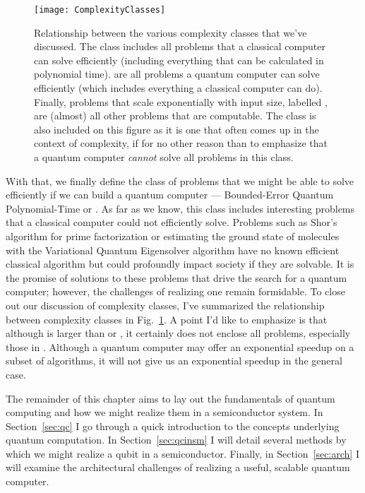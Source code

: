 \begin{figure}
  \texttt{[image: ComplexityClasses]}
  \caption[Relationship between various complexity classes]
  {Relationship between the various complexity classes that we've discussed. The class
   includes all problems that a classical computer can solve efficiently (including
  everything that can be calculated in polynomial time).  are all problems a quantum computer can
  solve efficiently (which includes everything a classical computer can do). Finally, problems that scale exponentially
  with input size, labelled , are (almost) all other problems that are computable. The class
   is also included on this figure as it is one that often comes up in the context of complexity,
  if for no other reason than to emphasize that a quantum computer \emph{cannot} solve all problems in
  this class.}
  \label{fig:complexity}
\end{figure}

With that, we finally define the class of problems that we might be able to solve efficiently if we
can build a quantum computer --- Bounded-Error Quantum Polynomial-Time or . As far as we know,
this class includes interesting problems that a classical computer could not efficiently solve. Problems
such as Shor's algorithm for prime factorization\cite{Shor} or estimating the ground state of molecules with
the Variational Quantum Eigensolver algorithm\cite{ncomms5213} have no known efficient classical algorithm
but could profoundly impact society if they are solvable. It is the promise of solutions to these problems
that drive the search for a quantum computer; however, the challenges of realizing one remain formidable. To close
out our discussion of complexity classes, I've summarized the relationship between complexity classes in
Fig.~\ref{fig:complexity}. A point I'd like to emphasize is that although  is larger than 
or , it certainly does not enclose all problems, especially those in . Although a
quantum computer may offer an exponential speedup on a subset of algorithms, it will not give us an exponential
speedup in the general case.

The remainder of this chapter aims to lay out the fundamentals of quantum computing and how we might realize
them in a semiconductor system. In Section~\ref{sec:qc} I go through a quick introduction to the concepts
underlying quantum computation. In Section~\ref{sec:qcinsm} I will detail several methods by which we might
realize a qubit in a semiconductor. Finally, in Section~\ref{sec:arch} I will examine the architectural
challenges of realizing a useful, scalable quantum computer.

